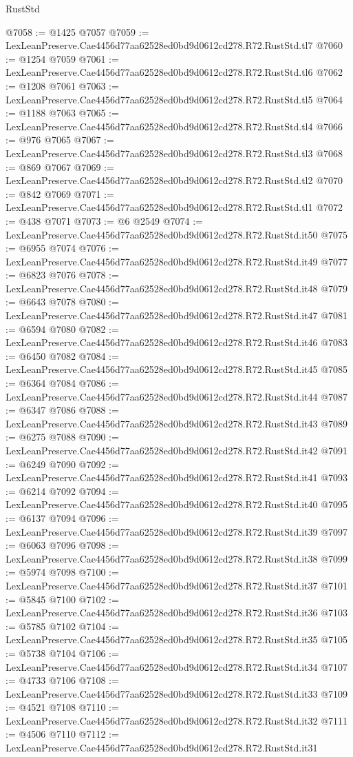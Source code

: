 \begin{lexlean}{RustStd}
\begin{coremodule}
@7058 := @1425 @7057
@7059 := LexLeanPreserve.Cae4456d77aa62528ed0bd9d0612cd278.R72.RustStd.tl7
@7060 := @1254 @7059
@7061 := LexLeanPreserve.Cae4456d77aa62528ed0bd9d0612cd278.R72.RustStd.tl6
@7062 := @1208 @7061
@7063 := LexLeanPreserve.Cae4456d77aa62528ed0bd9d0612cd278.R72.RustStd.tl5
@7064 := @1188 @7063
@7065 := LexLeanPreserve.Cae4456d77aa62528ed0bd9d0612cd278.R72.RustStd.tl4
@7066 := @976 @7065
@7067 := LexLeanPreserve.Cae4456d77aa62528ed0bd9d0612cd278.R72.RustStd.tl3
@7068 := @869 @7067
@7069 := LexLeanPreserve.Cae4456d77aa62528ed0bd9d0612cd278.R72.RustStd.tl2
@7070 := @842 @7069
@7071 := LexLeanPreserve.Cae4456d77aa62528ed0bd9d0612cd278.R72.RustStd.tl1
@7072 := @438 @7071
@7073 := @6 @2549
@7074 := LexLeanPreserve.Cae4456d77aa62528ed0bd9d0612cd278.R72.RustStd.it50
@7075 := @6955 @7074
@7076 := LexLeanPreserve.Cae4456d77aa62528ed0bd9d0612cd278.R72.RustStd.it49
@7077 := @6823 @7076
@7078 := LexLeanPreserve.Cae4456d77aa62528ed0bd9d0612cd278.R72.RustStd.it48
@7079 := @6643 @7078
@7080 := LexLeanPreserve.Cae4456d77aa62528ed0bd9d0612cd278.R72.RustStd.it47
@7081 := @6594 @7080
@7082 := LexLeanPreserve.Cae4456d77aa62528ed0bd9d0612cd278.R72.RustStd.it46
@7083 := @6450 @7082
@7084 := LexLeanPreserve.Cae4456d77aa62528ed0bd9d0612cd278.R72.RustStd.it45
@7085 := @6364 @7084
@7086 := LexLeanPreserve.Cae4456d77aa62528ed0bd9d0612cd278.R72.RustStd.it44
@7087 := @6347 @7086
@7088 := LexLeanPreserve.Cae4456d77aa62528ed0bd9d0612cd278.R72.RustStd.it43
@7089 := @6275 @7088
@7090 := LexLeanPreserve.Cae4456d77aa62528ed0bd9d0612cd278.R72.RustStd.it42
@7091 := @6249 @7090
@7092 := LexLeanPreserve.Cae4456d77aa62528ed0bd9d0612cd278.R72.RustStd.it41
@7093 := @6214 @7092
@7094 := LexLeanPreserve.Cae4456d77aa62528ed0bd9d0612cd278.R72.RustStd.it40
@7095 := @6137 @7094
@7096 := LexLeanPreserve.Cae4456d77aa62528ed0bd9d0612cd278.R72.RustStd.it39
@7097 := @6063 @7096
@7098 := LexLeanPreserve.Cae4456d77aa62528ed0bd9d0612cd278.R72.RustStd.it38
@7099 := @5974 @7098
@7100 := LexLeanPreserve.Cae4456d77aa62528ed0bd9d0612cd278.R72.RustStd.it37
@7101 := @5845 @7100
@7102 := LexLeanPreserve.Cae4456d77aa62528ed0bd9d0612cd278.R72.RustStd.it36
@7103 := @5785 @7102
@7104 := LexLeanPreserve.Cae4456d77aa62528ed0bd9d0612cd278.R72.RustStd.it35
@7105 := @5738 @7104
@7106 := LexLeanPreserve.Cae4456d77aa62528ed0bd9d0612cd278.R72.RustStd.it34
@7107 := @4733 @7106
@7108 := LexLeanPreserve.Cae4456d77aa62528ed0bd9d0612cd278.R72.RustStd.it33
@7109 := @4521 @7108
@7110 := LexLeanPreserve.Cae4456d77aa62528ed0bd9d0612cd278.R72.RustStd.it32
@7111 := @4506 @7110
@7112 := LexLeanPreserve.Cae4456d77aa62528ed0bd9d0612cd278.R72.RustStd.it31

\end{coremodule}
\end{lexlean}
